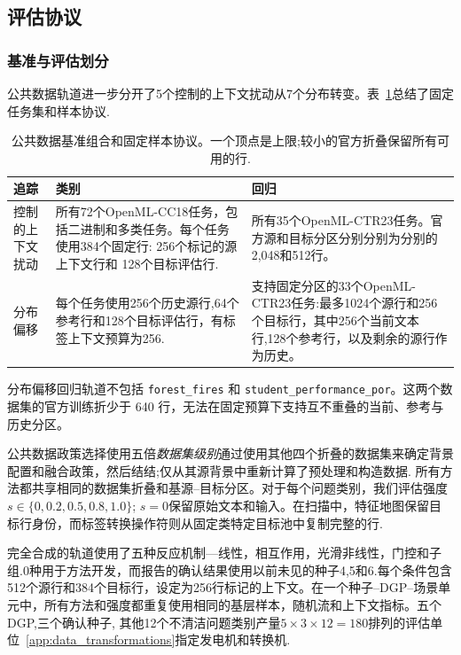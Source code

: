 \subsection{评估协议}
\label{app:evaluation_protocol}

\subsubsection{基准与评估划分}
\label{app:data_splits}

公共数据轨道进一步分开了5个控制的上下文扰动从7个分布转变。表~\ref{tab:public-benchmark-protocols}总结了固定任务集和样本协议.

\begin{table}[H]
  \caption{公共数据基准组合和固定样本协议。一个顶点是上限;较小的官方折叠保留所有可用的行.}
  \label{tab:public-benchmark-protocols}
  \centering
  \footnotesize
  \setlength{\tabcolsep}{4pt}
  \begin{tabular}{@{}>{\raggedright\arraybackslash}p{}
                      >{\raggedright\arraybackslash}p{}
                      >{\raggedright\arraybackslash}p{}@{}}
    \toprule 追踪&类别&回归\\
    \midrule 控制的上下文扰动&所有72个OpenML-CC18任务，包括二进制和多类任务。每个任务使用384个固定行: 256个标记的源上下文行和 128个目标评估行.
      &所有35个OpenML-CTR23任务。官方源和目标分区分别分别为分别的2,048和512行。\\
分布偏移&每个任务使用256个历史源行,64个参考行和128个目标评估行，有标签上下文预算为256.
      &支持固定分区的33个OpenML-CTR23任务:最多1024个源行和256个目标行，其中256个当前文本行,128个参考行，以及剩余的源行作为历史。\\
    \bottomrule
  \end{tabular}
\end{table}

分布偏移回归轨道不包括 \nolinkurl{forest_fires} 和 \nolinkurl{student_performance_por}。这两个数据集的官方训练折少于 640 行，无法在固定预算下支持互不重叠的当前、参考与历史分区。

公共数据政策选择使用五倍\emph{数据集级别}通过使用其他四个折叠的数据集来确定背景配置和融合政策，然后结结;仅从其源背景中重新计算了预处理和构造数据.
所有方法都共享相同的数据集折叠和基源--目标分区。对于每个问题类别，我们评估强度 $s\in\{0,0.2,0.5,0.8,1.0\}$; $s=0$保留原始文本和输入。在扫描中，特征地图保留目标行身份，而标签转换操作符则从固定类特定目标池中复制完整的行.

完全合成的轨道使用了五种反应机制---线性，相互作用，光滑非线性，门控和子组.0种用于方法开发，而报告的确认结果使用以前未见的种子4,5和6.每个条件包含512个源行和384个目标行，设定为256行标记的上下文。在一个种子--DGP--场景单元中，所有方法和强度都重复使用相同的基层样本，随机流和上下文指标。五个DGP,三个确认种子,
其他12个不清洁问题类别产量$5\times3\times12=180$排列的评估单位~\ref{app:data_transformations}指定发电机和转换机.

